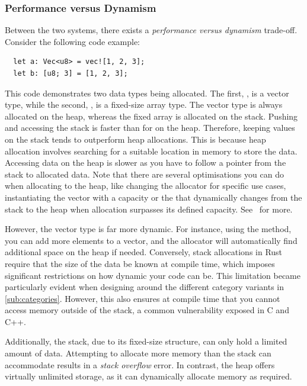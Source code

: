 \documentclass[11pt]{report}
\theoremstyle{definition}
\theoremstyle{plain}
\begin{document}
\subsubsection{Performance versus Dynamism}

Between the two systems, there exists a \textit{performance versus dynamism} trade-off. Consider the following code example:

\begin{verbatim}
  let a: Vec<u8> = vec![1, 2, 3];
  let b: [u8; 3] = [1, 2, 3];
\end{verbatim}

This code demonstrates two data types being allocated. The first, , is a vector type, while the second, , is a fixed-size array type. The vector type is always allocated on the heap, whereas the fixed array is allocated on the stack. Pushing  and accessing the stack is faster than for on the heap. Therefore, keeping values on the stack tends to outperform heap allocations. This is because heap allocation involves searching for a suitable location in memory to store the data. Accessing data on the heap is slower as you have to follow a pointer from the stack to allocated data. Note that there are several optimisations you can do when allocating to the heap, like changing the allocator for specific use cases, instantiating the vector with a capacity or the  that dynamically changes from the stack to the heap when allocation surpasses its defined capacity. See~\cite{rustlangPerformanceBook} for more.

However, the vector type is far more dynamic. For instance, using the  method, you can add more elements to a vector, and the allocator will automatically find additional space on the heap if needed. Conversely, stack allocations in Rust require that the size of the data be known at compile time, which imposes significant restrictions on how dynamic your code can be. This limitation became particularly evident when designing around the different category variants in \autoref{sub:categories}. However, this also ensures at compile time that you cannot access memory outside of the stack, a common vulnerability exposed in C and C++.

Additionally, the stack, due to its fixed-size structure, can only hold a limited amount of data. Attempting to allocate more memory than the stack can accommodate results in a \textit{stack overflow} error. In contrast, the heap offers virtually unlimited storage, as it can dynamically allocate memory as required.
\end{document}
